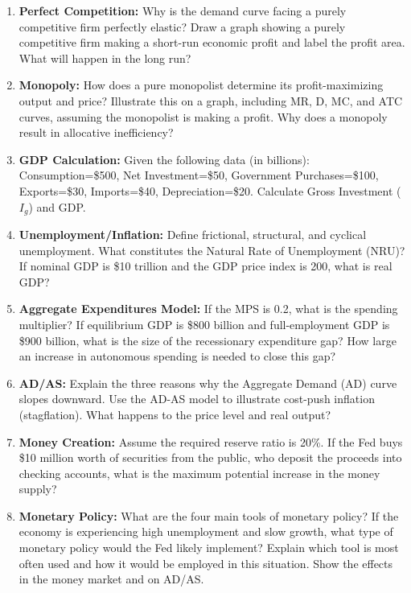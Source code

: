 \documentclass{article}
\begin{document}
\begin{enumerate}[label=\arabic*.]
    \item \textbf{Perfect Competition:} Why is the demand curve facing a purely competitive firm perfectly elastic? Draw a graph showing a purely competitive firm making a short-run economic profit and label the profit area. What will happen in the long run?
    \item \textbf{Monopoly:} How does a pure monopolist determine its profit-maximizing output and price? Illustrate this on a graph, including MR, D, MC, and ATC curves, assuming the monopolist is making a profit. Why does a monopoly result in allocative inefficiency?
    \item \textbf{GDP Calculation:} Given the following data (in billions): Consumption=\$500, Net Investment=\$50, Government Purchases=\$100, Exports=\$30, Imports=\$40, Depreciation=\$20. Calculate Gross Investment ($I_g$) and GDP.
    \item \textbf{Unemployment/Inflation:} Define frictional, structural, and cyclical unemployment. What constitutes the Natural Rate of Unemployment (NRU)? If nominal GDP is \$10 trillion and the GDP price index is 200, what is real GDP?
    \item \textbf{Aggregate Expenditures Model:} If the MPS is 0.2, what is the spending multiplier? If equilibrium GDP is \$800 billion and full-employment GDP is \$900 billion, what is the size of the recessionary expenditure gap? How large an increase in autonomous spending is needed to close this gap?
    \item \textbf{AD/AS:} Explain the three reasons why the Aggregate Demand (AD) curve slopes downward. Use the AD-AS model to illustrate cost-push inflation (stagflation). What happens to the price level and real output?
    \item \textbf{Money Creation:} Assume the required reserve ratio is 20\%. If the Fed buys \$10 million worth of securities from the public, who deposit the proceeds into checking accounts, what is the maximum potential increase in the money supply?
    \item \textbf{Monetary Policy:} What are the four main tools of monetary policy? If the economy is experiencing high unemployment and slow growth, what type of monetary policy would the Fed likely implement? Explain which tool is most often used and how it would be employed in this situation. Show the effects in the money market and on AD/AS.
\end{enumerate}
\end{document}
